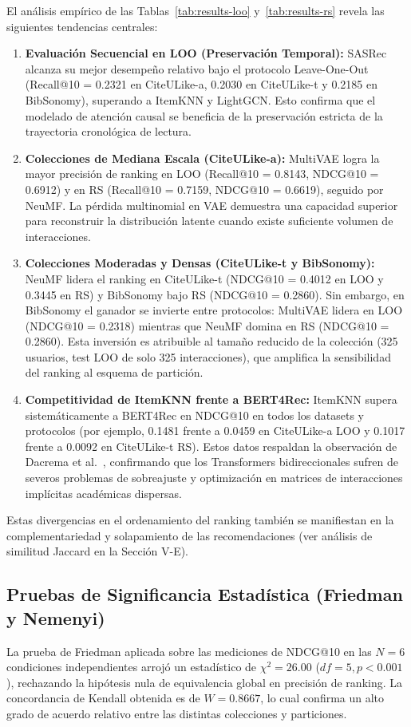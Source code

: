 \documentclass[journal]{IEEEtran}
\makeatletter
\newcommand{\at}[1]{@#1}
\makeatother
\begin{document}
El análisis empírico de las Tablas~\ref{tab:results-loo} y~\ref{tab:results-rs} revela las siguientes tendencias centrales:
\begin{enumerate}
    \item \textbf{Evaluación Secuencial en LOO (Preservación Temporal):} SASRec alcanza su mejor desempeño relativo bajo el protocolo Leave-One-Out (Recall\at{10} = 0.2321 en CiteULike-a, 0.2030 en CiteULike-t y 0.2185 en BibSonomy), superando a ItemKNN y LightGCN. Esto confirma que el modelado de atención causal se beneficia de la preservación estricta de la trayectoria cronológica de lectura.
    \item \textbf{Colecciones de Mediana Escala (CiteULike-a):} MultiVAE logra la mayor precisión de ranking en LOO (Recall\at{10} = 0.8143, NDCG\at{10} = 0.6912) y en RS (Recall\at{10} = 0.7159, NDCG\at{10} = 0.6619), seguido por NeuMF. La pérdida multinomial en VAE demuestra una capacidad superior para reconstruir la distribución latente cuando existe suficiente volumen de interacciones.
    \item \textbf{Colecciones Moderadas y Densas (CiteULike-t y BibSonomy):} NeuMF lidera el ranking en CiteULike-t (NDCG\at{10} = 0.4012 en LOO y 0.3445 en RS) y BibSonomy bajo RS (NDCG\at{10} = 0.2860). Sin embargo, en BibSonomy el ganador se invierte entre protocolos: MultiVAE lidera en LOO (NDCG\at{10} = 0.2318) mientras que NeuMF domina en RS (NDCG\at{10} = 0.2860). Esta inversión es atribuible al tamaño reducido de la colección (325 usuarios, test LOO de solo 325 interacciones), que amplifica la sensibilidad del ranking al esquema de partición.
    \item \textbf{Competitividad de ItemKNN frente a BERT4Rec:} ItemKNN supera sistemáticamente a BERT4Rec en NDCG\at{10} en todos los datasets y protocolos (por ejemplo, 0.1481 frente a 0.0459 en CiteULike-a LOO y 0.1017 frente a 0.0092 en CiteULike-t RS). Estos datos respaldan la observación de Dacrema et al.~\cite{dacrema2019really}, confirmando que los Transformers bidireccionales sufren de severos problemas de sobreajuste y optimización en matrices de interacciones implícitas académicas dispersas.
\end{enumerate}

Estas divergencias en el ordenamiento del ranking también se manifiestan en la complementariedad y solapamiento de las recomendaciones (ver análisis de similitud Jaccard en la Sección V-E).

\subsection{Pruebas de Significancia Estadística (Friedman y Nemenyi)}
La prueba de Friedman aplicada sobre las mediciones de NDCG\at{10} en las $N=6$ condiciones independientes arrojó un estadístico de $\chi^2 = 26.00$ ($df = 5, p < 0.001$), rechazando la hipótesis nula de equivalencia global en precisión de ranking. La concordancia de Kendall obtenida es de $W = 0.8667$, lo cual confirma un alto grado de acuerdo relativo entre las distintas colecciones y particiones.
\end{document}
